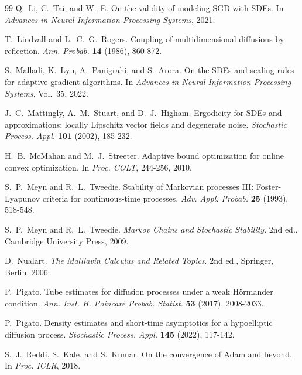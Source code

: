 \documentclass[11pt, a4paper,leqno]{amsart}
\theoremstyle{definition}
\numberwithin{equation}{section}
\begin{document}
\begin{thebibliography}{99}
Q.~Li, C.~Tai, and W.~E.
\newblock On the validity of modeling SGD with SDEs.
\newblock In \emph{Advances in Neural Information Processing Systems}, 2021.

T.~Lindvall and L.~C.~G.~Rogers.
\newblock Coupling of multidimensional diffusions by reflection.
\newblock \emph{Ann. Probab.} \textbf{14} (1986), 860-872.

S.~Malladi, K.~Lyu, A.~Panigrahi, and S.~Arora.
\newblock On the SDEs and scaling rules for adaptive gradient algorithms.
\newblock In \emph{Advances in Neural Information Processing Systems}, Vol.~35, 2022.

J.~C.~Mattingly, A.~M.~Stuart, and D.~J.~Higham.
\newblock Ergodicity for SDEs and approximations: locally Lipschitz vector fields and degenerate noise.
\newblock \emph{Stochastic Process. Appl.} \textbf{101} (2002), 185-232.





H.~B.~McMahan and M.~J.~Streeter.
\newblock Adaptive bound optimization for online convex optimization.
\newblock In \emph{Proc. COLT}, 244-256, 2010.

S.~P.~Meyn and R.~L.~Tweedie.
\newblock Stability of Markovian processes III: Foster-Lyapunov criteria for continuous-time processes.
\newblock \emph{Adv. Appl. Probab.} \textbf{25} (1993), 518-548.

S.~P.~Meyn and R.~L.~Tweedie.
\newblock \emph{Markov Chains and Stochastic Stability}.
\newblock 2nd ed., Cambridge University Press, 2009.



D.~Nualart.
\newblock \emph{The Malliavin Calculus and Related Topics}.
\newblock 2nd ed., Springer, Berlin, 2006.


P.~Pigato.
\newblock Tube estimates for diffusion processes under a weak H\"ormander condition.
\newblock \emph{Ann. Inst. H. Poincar\'e Probab. Statist.} \textbf{53} (2017), 2008-2033.

P.~Pigato.
\newblock Density estimates and short-time asymptotics for a hypoelliptic diffusion process.
\newblock \emph{Stochastic Process. Appl.} \textbf{145} (2022), 117-142.

S.~J.~Reddi, S.~Kale, and S.~Kumar.
\newblock On the convergence of Adam and beyond.
\newblock In \emph{Proc. ICLR}, 2018.


\end{thebibliography}
\end{document}
